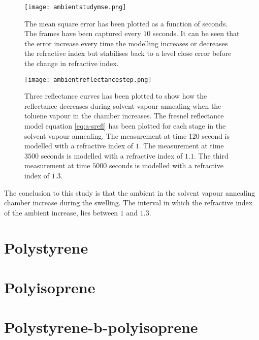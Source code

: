 \documentclass[MasterThesisMain.tex]{subfiles}
\begin{document}
\begin{figure}
\centering
\texttt{[image: ambientstudymse.png]}
\caption{The mean square error has been plotted as a function of seconds. The frames have been captured every $10$ seconds. It can be seen that the error increase every time the modelling increases or decreases the refractive index but stabilises back to a level close error before the change in refractive index.}
\label{fig:ambientmse}
\end{figure}

\begin{figure}
\centering
\texttt{[image: ambientreflectancestep.png]}
\caption{Three reflectance curves has been plotted to show how the reflectance decreases during solvent vapour annealing when the toluene vapour in the chamber increases. The fresnel reflectance model equation \ref{eq:a-srefl} has been plotted for each stage in the solvent vapour annealing. The measurement at time $120$ second is modelled with a refractive index of $1$. The measurement at time $3500$ seconds is modelled with a refractive index of $1.1$. The third measurement at time $5000$ seconds is modelled with a refractive index of $1.3$.}
\label{fig:ambientreflectance}
\end{figure}

The conclusion to this study is that the ambient in the solvent vapour annealing chamber increase during the swelling. The interval in which the refractive index of the ambient increase, lies between $1$ and $1.3$. 
	
\section{Polystyrene}
	
\section{Polyisoprene}
	
\section{Polystyrene-b-polyisoprene}
\end{document}

